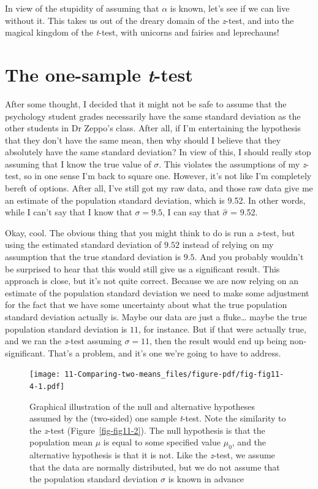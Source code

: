 \documentclass[
  a4paper,
]{book}
\begin{document}
In view of the stupidity of assuming that \(\alpha\) is known, let's see
if we can live without it. This takes us out of the dreary domain of the
\emph{z}-test, and into the magical kingdom of the \emph{t}-test, with
unicorns and fairies and leprechauns!

\hypertarget{sec-The-one-sample-t-test}{%
\section{\texorpdfstring{The one-sample
\emph{t}-test}{The one-sample t-test}}\label{sec-The-one-sample-t-test}}

After some thought, I decided that it might not be safe to assume that
the psychology student grades necessarily have the same standard
deviation as the other students in Dr Zeppo's class. After all, if I'm
entertaining the hypothesis that they don't have the same mean, then why
should I believe that they absolutely have the same standard deviation?
In view of this, I should really stop assuming that I know the true
value of \(\sigma\). This violates the assumptions of my \emph{z}-test,
so in one sense I'm back to square one. However, it's not like I'm
completely bereft of options. After all, I've still got my raw data, and
those raw data give me an estimate of the population standard deviation,
which is 9.52. In other words, while I can't say that I know that
\(\sigma = 9.5\), I can say that \(\hat{\sigma}\) = 9.52.

Okay, cool. The obvious thing that you might think to do is run a
\emph{z}-test, but using the estimated standard deviation of \(9.52\)
instead of relying on my assumption that the true standard deviation is
\(9.5\). And you probably wouldn't be surprised to hear that this would
still give us a significant result. This approach is close, but it's not
quite correct. Because we are now relying on an estimate of the
population standard deviation we need to make some adjustment for the
fact that we have some uncertainty about what the true population
standard deviation actually is. Maybe our data are just a fluke\ldots{}
maybe the true population standard deviation is \(11\), for instance.
But if that were actually true, and we ran the \emph{z}-test assuming
\(\sigma=11\), then the result would end up being non-significant.
That's a problem, and it's one we're going to have to address.

\begin{figure}

\texttt{[image: 11-Comparing-two-means\_files/figure-pdf/fig-fig11-4-1.pdf]} \hfill{}

\caption{\label{fig-fig11-4}Graphical illustration of the null and
alternative hypotheses assumed by the (two-sided) one sample
\emph{t}-test. Note the similarity to the \emph{z}-test
(Figure~\ref{fig-fig11-2}). The null hypothesis is that the population
mean \(\mu\) is equal to some specified value \(\mu_0\), and the
alternative hypothesis is that it is not. Like the \emph{z}-test, we
assume that the data are normally distributed, but we do not assume that
the population standard deviation \(\sigma\) is known in advance}

\end{figure}
\end{document}
